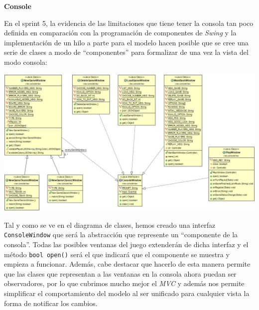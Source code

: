 \documentclass[../DocumentoOficial.tex]{subfiles}
\begin{document}
\begin{sprint}[5]
\textbf{Console}

En el sprint 5, la evidencia de las limitaciones que tiene tener la consola tan poco definida en comparación con la programación de componentes de \textit{Swing} y la implementación de un hilo a parte para el modelo hacen posible que se cree una serie de clases a modo de ``componentes'' para formalizar de una vez la vista del modo consola:
\newpage

\begin{center}
\includegraphics[scale=0.55, angle=90]{DiagramaClasesConsola}
\end{center}
Tal y como se ve en el diagrama de clases, hemos creado una interfaz \texttt{ConsoleWindow} que será la abstracción que represente un ``componente de la consola''. Todas las posibles ventanas del juego extenderán de dicha interfaz y el método \texttt{bool open()} será el que indicará que el componente se muestra y empieza a funcionar. Además, cabe destacar que hacerlo de esta manera permite que las clases que representan a las ventanas en la consola ahora puedan ser observadores, por lo que cubrimos mucho mejor el \textit{MVC} y además nos permite simplificar el comportamiento del modelo al ser unificado para cualquier vista la forma de notificar los cambios.


\end{sprint}
\end{document}
